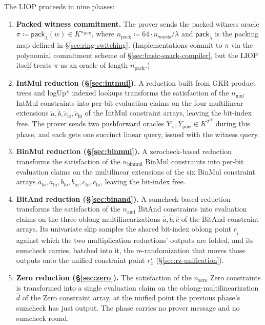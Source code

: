 \documentclass{article}
\theoremstyle{definition}
\newcommand*{\mle}{\widetilde}
\begin{document}
The LIOP proceeds in nine phases:
\begin{enumerate}
\item \textbf{Packed witness commitment.} The prover sends the packed witness oracle $\pi \coloneqq \textsf{pack}_\lambda(w) \in K^{n_\text{pack}}$, where $n_\text{pack} \coloneqq 64 \cdot n_\text{words} / \lambda$ and $\textsf{pack}_\lambda$ is the packing map defined in \S\ref{sec:ring-switching}. (Implementations commit to $\pi$ via the polynomial commitment scheme of \S\ref{sec:basic-snark-compiler}, but the LIOP itself treats $\pi$ as an oracle of length $n_\text{pack}$.)
\item \textbf{IntMul reduction (\S\ref{sec:intmul}).} A reduction built from GKR product trees and logUp* indexed lookups transforms the satisfaction of the $n_\text{mul}$ IntMul constraints into per-bit evaluation claims on the four multilinear extensions $\mle{a}, \mle{b}, \mle{c}_\text{lo}, \mle{c}_\text{hi}$ of the IntMul constraint arrays, leaving the bit-index free. The prover sends two pushforward oracles $Y_\times, Y_\text{pow} \in K^{2^{16}}$ during this phase, and each gets one succinct linear query, issued with the witness query.
\item \textbf{BinMul reduction (\S\ref{sec:binmul}).} A zerocheck-based reduction transforms the satisfaction of the $n_\text{binmul}$ BinMul constraints into per-bit evaluation claims on the multilinear extensions of the six BinMul constraint arrays $a_\text{lo}, a_\text{hi}, b_\text{lo}, b_\text{hi}, c_\text{lo}, c_\text{hi}$, leaving the bit-index free.
\item \textbf{BitAnd reduction (\S\ref{sec:binand}).} A sumcheck-based reduction transforms the satisfaction of the $n_\text{and}$ BitAnd constraints into evaluation claims on the three oblong-multilinearizations $\widehat{a}, \widehat{b}, \widehat{c}$ of the BitAnd constraint arrays. Its univariate skip samples the shared bit-index oblong point $r_{\widehat{i}}$ against which the two multiplication reductions' outputs are folded, and its sumcheck carries, batched into it, the re-randomization that moves those outputs onto the unified constraint point $r^\star_x$ (\S\ref{sec:rz-unification}).
\item \textbf{Zero reduction (\S\ref{sec:zero}).} The satisfaction of the $n_\text{zero}$ Zero constraints is transformed into a single evaluation claim on the oblong-multilinearization $\widehat{d}$ of the Zero constraint array, at the unified point the previous phase's sumcheck has just output. The phase carries no prover message and no sumcheck round.

\end{enumerate}
\end{document}
